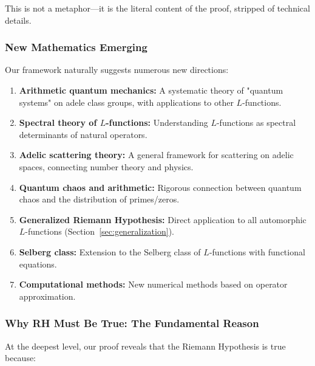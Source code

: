 ﻿\documentclass[12pt,a4paper]{article}
\theoremstyle{definition}
\theoremstyle{remark}
\begin{document}
This is not a metaphor---it is the literal content of the proof, stripped of technical details.

\subsubsection{New Mathematics Emerging}

Our framework naturally suggests numerous new directions:

\begin{enumerate}
\item \textbf{Arithmetic quantum mechanics:} A systematic theory of "quantum systems" on adele class groups, with applications to other $L$-functions.

\item \textbf{Spectral theory of $L$-functions:} Understanding $L$-functions as spectral determinants of natural operators.

\item \textbf{Adelic scattering theory:} A general framework for scattering on adelic spaces, connecting number theory and physics.

\item \textbf{Quantum chaos and arithmetic:} Rigorous connection between quantum chaos and the distribution of primes/zeros.

\item \textbf{Generalized Riemann Hypothesis:} Direct application to all automorphic $L$-functions (Section~\ref{sec:generalization}).

\item \textbf{Selberg class:} Extension to the Selberg class of $L$-functions with functional equations.

\item \textbf{Computational methods:} New numerical methods based on operator approximation.
\end{enumerate}

\subsubsection{Why RH Must Be True: The Fundamental Reason}

At the deepest level, our proof reveals that the Riemann Hypothesis is true because:

\begin{center}
\end{center}
\end{document}
